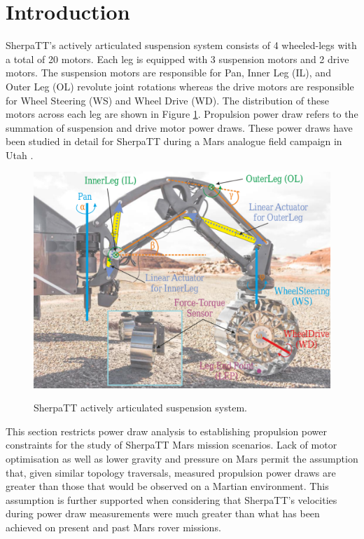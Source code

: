 \section{Introduction}
\label{sec:PropulsionPowerConstraints:Introduction}
SherpaTT's actively articulated suspension system consists of 4 wheeled-legs with a total of 20 motors. Each leg is equipped with 3 suspension motors and 2 drive motors. The suspension motors are responsible for Pan, Inner Leg (IL), and Outer Leg (OL) revolute joint rotations whereas the drive motors are responsible for Wheel Steering (WS) and Wheel Drive (WD). The distribution of these motors across each leg are shown in Figure \ref{fig:sherpatt-actively-articulated-suspension-system}. Propulsion power draw refers to the summation of suspension and drive motor power draws. These power draws have been studied in detail for SherpaTT during a Mars analogue field campaign in Utah .

\begin{figure}[h]
  \centering
  \hypersetup{linkcolor=captionTextColor}
  \includegraphics[width=0.8\linewidth]{sections/locomotion-power-draws/images/sherpatt-actively-articulated-suspension-sytem.png}\\
  \caption[SherpaTT actively articulated suspension system]
          {SherpaTT actively articulated suspension system.}
  \label{fig:sherpatt-actively-articulated-suspension-system}
\end{figure}

 This section restricts power draw analysis to establishing propulsion power constraints for the study of SherpaTT Mars mission scenarios. Lack of motor optimisation as well as lower gravity and pressure on Mars permit the assumption that, given similar topology traversals, measured propulsion power draws are greater than those that would be observed on a Martian environment. This assumption is further supported when considering that SherpaTT's velocities during power draw measurements were much greater than what has been achieved on present and past Mars rover missions.


